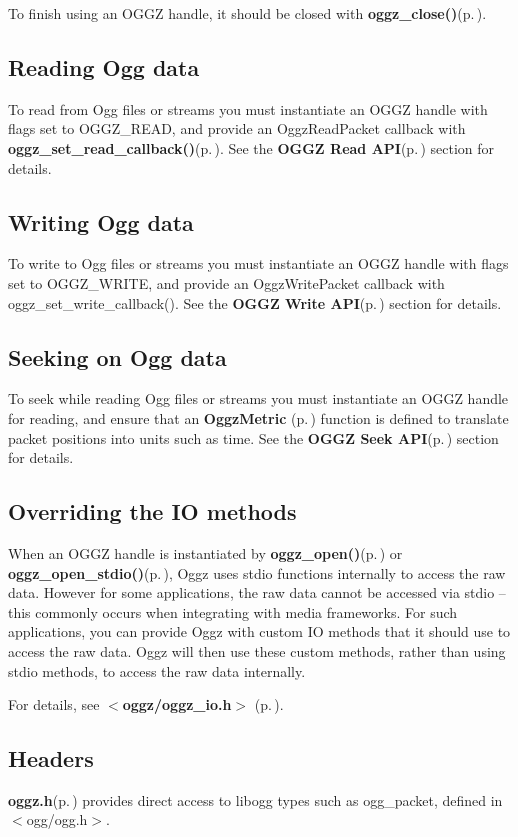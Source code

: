 To finish using an OGGZ handle, it should be closed with {\bf oggz\_\-close()}{\rm (p.\,\pageref{oggz_8h_a8})}.\subsection{Reading Ogg data}\label{reading}
To read from Ogg files or streams you must instantiate an OGGZ handle with flags set to OGGZ\_\-READ, and provide an Oggz\-Read\-Packet callback with {\bf oggz\_\-set\_\-read\_\-callback()}{\rm (p.\,\pageref{group__read__api_ga1})}. See the {\bf OGGZ Read API}{\rm (p.\,\pageref{group__read__api})} section for details.\subsection{Writing Ogg data}\label{writing}
To write to Ogg files or streams you must instantiate an OGGZ handle with flags set to OGGZ\_\-WRITE, and provide an Oggz\-Write\-Packet callback with oggz\_\-set\_\-write\_\-callback(). See the {\bf OGGZ Write API}{\rm (p.\,\pageref{group__write__api})} section for details.\subsection{Seeking on Ogg data}\label{seeking}
To seek while reading Ogg files or streams you must instantiate an OGGZ handle for reading, and ensure that an {\bf Oggz\-Metric }{\rm (p.\,\pageref{group__metric})} function is defined to translate packet positions into units such as time. See the {\bf OGGZ Seek API}{\rm (p.\,\pageref{group__seek__api})} section for details.\subsection{Overriding the IO methods}\label{io}
When an OGGZ handle is instantiated by {\bf oggz\_\-open()}{\rm (p.\,\pageref{oggz_8h_a5})} or {\bf oggz\_\-open\_\-stdio()}{\rm (p.\,\pageref{oggz_8h_a6})}, Oggz uses stdio functions internally to access the raw data. However for some applications, the raw data cannot be accessed via stdio -- this commonly occurs when integrating with media frameworks. For such applications, you can provide Oggz with custom IO methods that it should use to access the raw data. Oggz will then use these custom methods, rather than using stdio methods, to access the raw data internally.

For details, see {\bf $<$oggz/oggz\_\-io.h$>$ }{\rm (p.\,\pageref{oggz__io_8h})}.\subsection{Headers}\label{headers}
{\bf oggz.h}{\rm (p.\,\pageref{oggz_8h})} provides direct access to libogg types such as ogg\_\-packet, defined in $<$ogg/ogg.h$>$.

